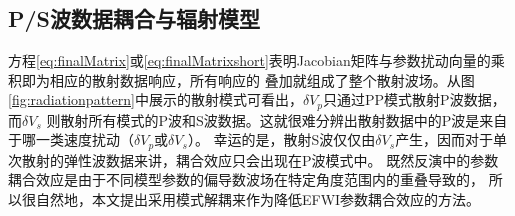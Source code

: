 \subsection{P/S波数据耦合与辐射模型}
方程\eqref{eq:finalMatrix}或\eqref{eq:finalMatrixshort}表明Jacobian矩阵与参数扰动向量的乘积即为相应的散射数据响应，所有响应的
叠加就组成了整个散射波场。从图\ref{fig:radiationpattern}中展示的散射模式可看出，$\delta V_p$只通过PP模式散射P波数据，而$\delta V_s$
则散射所有模式的P波和S波数据。这就很难分辨出散射数据中的P波是来自于哪一类速度扰动（$\delta V_p$或$\delta V_s$）。
幸运的是，散射S波仅仅由$\delta V_s$产生，因而对于单次散射的弹性波数据来讲，耦合效应只会出现在P波模式中。
既然反演中的参数耦合效应是由于不同模型参数的偏导数波场在特定角度范围内的重叠导致的\cite{tarantola:1986,operto2013guided}，
所以很自然地，本文提出采用模式解耦来作为降低EFWI参数耦合效应的方法。
